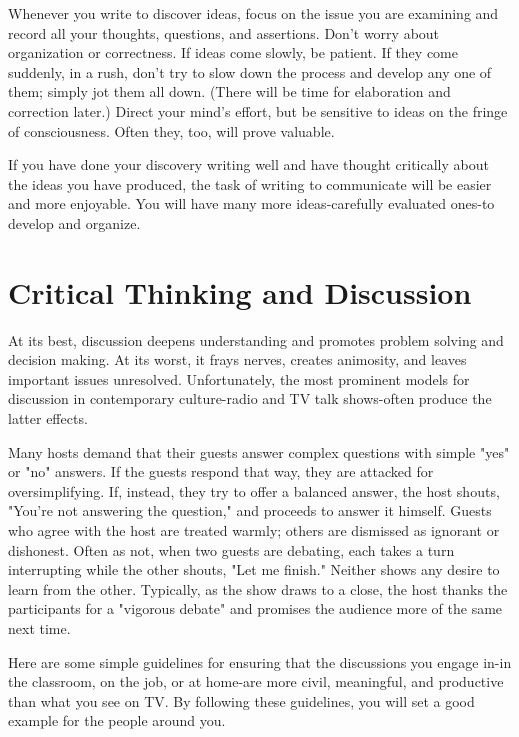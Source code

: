 \documentclass{book}
\begin{document}
Whenever you write to discover ideas, focus on the issue you are examining and record all your thoughts, questions, and assertions. Don’t worry about organization or correctness. If ideas come slowly, be patient. If they come suddenly, in a rush, don’t try to slow down the process and develop any one of them; simply jot them all down. (There will be time for elaboration and correction later.) Direct your mind’s effort, but be sensitive to ideas on the fringe of consciousness. Often they, too, will prove valuable.

If you have done your discovery writing well and have thought critically about the ideas you have produced, the task of writing to communicate will be easier and more enjoyable. You will have many more ideas-carefully evaluated ones-to develop and organize.

\section{Critical Thinking and Discussion}

At its best, discussion deepens understanding and promotes problem solving and decision making. At its worst, it frays nerves, creates animosity, and leaves important issues unresolved. Unfortunately, the most prominent models for discussion in contemporary culture-radio and TV talk shows-often produce the latter effects.

Many hosts demand that their guests answer complex questions with simple "yes" or "no" answers. If the guests respond that way, they are attacked for oversimplifying. If, instead, they try to offer a balanced answer, the host shouts, "You’re not answering the question," and proceeds to answer it himself. Guests who agree with the host are treated warmly; others are dismissed as ignorant or dishonest. Often as not, when two guests are debating, each takes a turn interrupting while the other shouts, "Let me finish." Neither shows any desire to learn from the other. Typically, as the show draws to a close, the host thanks the participants for a "vigorous debate" and promises the audience more of the same next time.

Here are some simple guidelines for ensuring that the discussions you engage in-in the classroom, on the job, or at home-are more civil, meaningful, and productive than what you see on TV. By following these guidelines, you will set a good example for the people around you.
\end{document}

